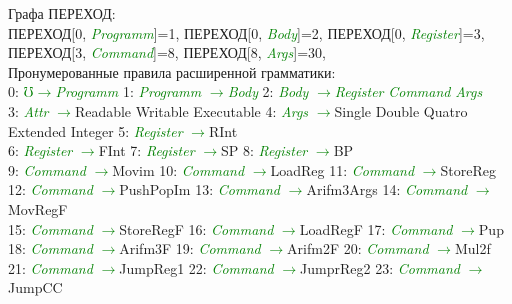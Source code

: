 \documentclass[a0]{a0poster}
\begin{document}
Графа ПЕРЕХОД:\\
ПЕРЕХОД[0, \textcolor{Green}{\textit{Programm}}]=1, ПЕРЕХОД[0, \textcolor{Green}{\textit{Body}}]=2, ПЕРЕХОД[0, \textcolor{Green}{\textit{Register}}]=3, ПЕРЕХОД[3, \textcolor{Green}{\textit{Command}}]=8, ПЕРЕХОД[8, \textcolor{Green}{\textit{Args}}]=30, 
\\
 
Пронумерованные правила расширенной грамматики:\\
0: \textcolor{Green}{$\mho$}\textcolor{Green}{$\to$}\textcolor{Green}{\textit{Programm}} 1: \textcolor{Green}{\textit{Programm}} \textcolor{Green}{$\to$}\textcolor{Green}{\textit{Body}} 2: \textcolor{Green}{\textit{Body}} \textcolor{Green}{$\to$}\textcolor{Green}{\textit{Register}} \textcolor{Green}{\textit{Command}} \textcolor{Green}{\textit{Args}} \\
3: \textcolor{Green}{\textit{Attr}} \textcolor{Green}{$\to$}Readable Writable Executable 4: \textcolor{Green}{\textit{Args}} \textcolor{Green}{$\to$}Single Double Quatro Extended Integer 5: \textcolor{Green}{\textit{Register}} \textcolor{Green}{$\to$}RInt \\
6: \textcolor{Green}{\textit{Register}} \textcolor{Green}{$\to$}FInt 7: \textcolor{Green}{\textit{Register}} \textcolor{Green}{$\to$}SP 8: \textcolor{Green}{\textit{Register}} \textcolor{Green}{$\to$}BP \\
9: \textcolor{Green}{\textit{Command}} \textcolor{Green}{$\to$}Movim 10: \textcolor{Green}{\textit{Command}} \textcolor{Green}{$\to$}LoadReg 11: \textcolor{Green}{\textit{Command}} \textcolor{Green}{$\to$}StoreReg \\
12: \textcolor{Green}{\textit{Command}} \textcolor{Green}{$\to$}PushPopIm 13: \textcolor{Green}{\textit{Command}} \textcolor{Green}{$\to$}Arifm3Args 14: \textcolor{Green}{\textit{Command}} \textcolor{Green}{$\to$}MovRegF \\
15: \textcolor{Green}{\textit{Command}} \textcolor{Green}{$\to$}StoreRegF 16: \textcolor{Green}{\textit{Command}} \textcolor{Green}{$\to$}LoadRegF 17: \textcolor{Green}{\textit{Command}} \textcolor{Green}{$\to$}Pup \\
18: \textcolor{Green}{\textit{Command}} \textcolor{Green}{$\to$}Arifm3F 19: \textcolor{Green}{\textit{Command}} \textcolor{Green}{$\to$}Arifm2F 20: \textcolor{Green}{\textit{Command}} \textcolor{Green}{$\to$}Mul2f \\
21: \textcolor{Green}{\textit{Command}} \textcolor{Green}{$\to$}JumpReg1 22: \textcolor{Green}{\textit{Command}} \textcolor{Green}{$\to$}JumprReg2 23: \textcolor{Green}{\textit{Command}} \textcolor{Green}{$\to$}JumpCC \\
\end{document}

